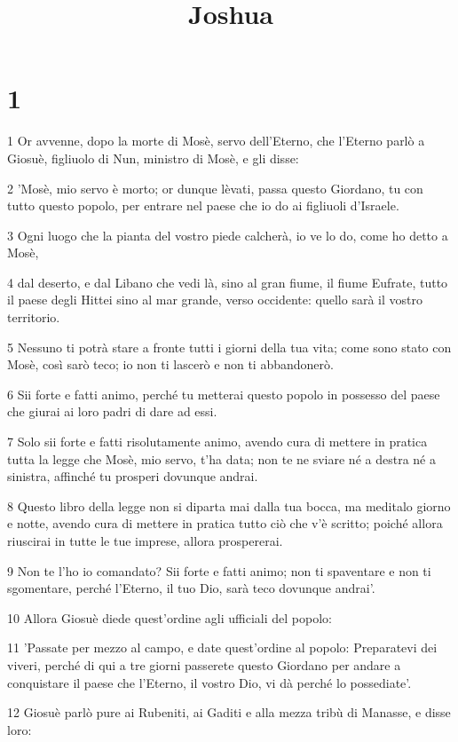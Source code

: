 

\title{Joshua}


\chapter{1}

\par 1 Or avvenne, dopo la morte di Mosè, servo dell'Eterno, che l'Eterno parlò a Giosuè, figliuolo di Nun, ministro di Mosè, e gli disse:
\par 2 'Mosè, mio servo è morto; or dunque lèvati, passa questo Giordano, tu con tutto questo popolo, per entrare nel paese che io do ai figliuoli d'Israele.
\par 3 Ogni luogo che la pianta del vostro piede calcherà, io ve lo do, come ho detto a Mosè,
\par 4 dal deserto, e dal Libano che vedi là, sino al gran fiume, il fiume Eufrate, tutto il paese degli Hittei sino al mar grande, verso occidente: quello sarà il vostro territorio.
\par 5 Nessuno ti potrà stare a fronte tutti i giorni della tua vita; come sono stato con Mosè, così sarò teco; io non ti lascerò e non ti abbandonerò.
\par 6 Sii forte e fatti animo, perché tu metterai questo popolo in possesso del paese che giurai ai loro padri di dare ad essi.
\par 7 Solo sii forte e fatti risolutamente animo, avendo cura di mettere in pratica tutta la legge che Mosè, mio servo, t'ha data; non te ne sviare né a destra né a sinistra, affinché tu prosperi dovunque andrai.
\par 8 Questo libro della legge non si diparta mai dalla tua bocca, ma meditalo giorno e notte, avendo cura di mettere in pratica tutto ciò che v'è scritto; poiché allora riuscirai in tutte le tue imprese, allora prospererai.
\par 9 Non te l'ho io comandato? Sii forte e fatti animo; non ti spaventare e non ti sgomentare, perché l'Eterno, il tuo Dio, sarà teco dovunque andrai'.
\par 10 Allora Giosuè diede quest'ordine agli ufficiali del popolo:
\par 11 'Passate per mezzo al campo, e date quest'ordine al popolo: Preparatevi dei viveri, perché di qui a tre giorni passerete questo Giordano per andare a conquistare il paese che l'Eterno, il vostro Dio, vi dà perché lo possediate'.
\par 12 Giosuè parlò pure ai Rubeniti, ai Gaditi e alla mezza tribù di Manasse, e disse loro:
